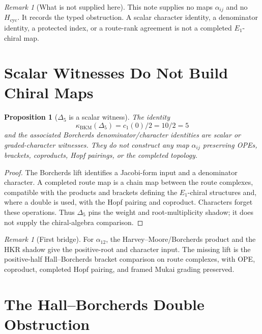 \documentclass[11pt]{amsart}
\theoremstyle{plain}
\newtheorem{proposition}[theorem]{Proposition}
\theoremstyle{definition}
\theoremstyle{remark}
\newtheorem{remark}[theorem]{Remark}
\providecommand{\Eone}{E_1}
\providecommand{\kBKM}{\kappa_{\mathrm{BKM}}}
\providecommand{\Delt}{\Delta_{5}}
\begin{document}
\begin{remark}[What is not supplied here]
\label{rem:not-supplied}
This note supplies no maps $\alpha_{ij}$ and no $H_{\mathrm{cyc}}$.  It
records the typed obstruction.  A scalar character identity, a
denominator identity, a protected index, or a route-rank agreement is
not a completed $\Eone$-chiral map.
\end{remark}

\section{Scalar Witnesses Do Not Build Chiral Maps}
\label{sec:scalar-witnesses}

\begin{proposition}[$\Delt$ is a scalar witness]
\label{prop:delta5-scalar-witness}
The identity
\[
 \kBKM(\Delt)=c_1(0)/2=10/2=5
\]
and the associated Borcherds denominator/character identities are scalar
or graded-character witnesses.  They do not construct any map
$\alpha_{ij}$ preserving OPEs, brackets, coproducts, Hopf pairings, or
the completed topology.
\end{proposition}

\begin{proof}
The Borcherds lift identifies a Jacobi-form input and a denominator
character.  A completed route map is a chain map between the route
complexes, compatible with the products and brackets defining the
$\Eone$-chiral structures and, where a double is used, with the Hopf
pairing and coproduct.  Characters forget these operations.  Thus
$\Delt$ pins the weight and root-multiplicity shadow; it does not supply
the chiral-algebra comparison.
\end{proof}

\begin{remark}[First bridge]
\label{rem:first-bridge}
For $\alpha_{12}$, the Harvey--Moore/Borcherds product and the HKR
shadow give the positive-root and character input.  The missing lift is
the positive-half Hall--Borcherds bracket comparison on route complexes,
with OPE, coproduct, completed Hopf pairing, and framed Mukai grading
preserved.
\end{remark}

\section{The Hall--Borcherds Double Obstruction}
\label{sec:double-obstruction}
\end{document}
